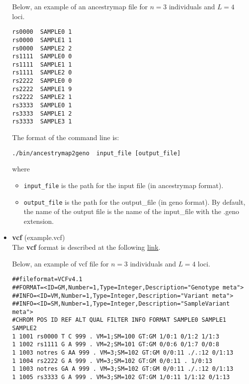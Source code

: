 \documentclass[10pt,a4paper]{article}
\begin{document}
\begin{itemize}
Below, an example of an ancestrymap file for $n=3$ individuals and $L=4$ loci.
\begin{center}
\footnotesize
\begin{Verbatim}[frame=single]
rs0000  SAMPLE0 1
rs0000  SAMPLE1 1
rs0000  SAMPLE2 2
rs1111  SAMPLE0 0
rs1111  SAMPLE1 1
rs1111  SAMPLE2 0
rs2222  SAMPLE0 0
rs2222  SAMPLE1 9
rs2222  SAMPLE2 1
rs3333  SAMPLE0 1
rs3333  SAMPLE1 2
rs3333  SAMPLE3 1
\end{Verbatim}
\end{center}

The format of the command line is:
\begin{Verbatim}[frame=single]
./bin/ancestrymap2geno  input_file [output_file]
\end{Verbatim}
where 
\begin{itemize}
\item \verb|input_file| is the path for the input file (in ancestrymap format).
\item \verb|output_file| is the path for the output\_file (in geno format). 
By default, the name of the output file is the name of the input\_file with the .geno extension.
\end{itemize}

\item {\bf vcf} (example.vcf)\\
The {\bf vcf} format is described at the following \href{http://www.1000genomes.org/wiki/Analysis/Variant\%20Call\%20Format/vcf-variant-call-format-version-41}{link}.

Below, an example of vcf file for $n=3$ individuals and $L=4$ loci.
\begin{center}
\footnotesize
\begin{Verbatim}[frame=single]
##fileformat=VCFv4.1 
##FORMAT=<ID=GM,Number=1,Type=Integer,Description="Genotype meta"> 
##INFO=<ID=VM,Number=1,Type=Integer,Description="Variant meta"> 
##INFO=<ID=SM,Number=1,Type=Integer,Description="SampleVariant meta"> 
#CHROM POS ID REF ALT QUAL FILTER INFO FORMAT SAMPLE0 SAMPLE1 SAMPLE2 
1 1001 rs0000 T C 999 . VM=1;SM=100 GT:GM 1/0:1 0/1:2 1/1:3 
1 1002 rs1111 G A 999 . VM=2;SM=101 GT:GM 0/0:6 0/1:7 0/0:8 
1 1003 notres G AA 999 . VM=3;SM=102 GT:GM 0/0:11 ./.:12 0/1:13 
1 1004 rs2222 G A 999 . VM=3;SM=102 GT:GM 0/0:11 . 1/0:13
1 1003 notres GA A 999 . VM=3;SM=102 GT:GM 0/0:11 ./.:12 0/1:13 
1 1005 rs3333 G A 999 . VM=3;SM=102 GT:GM 1/0:11 1/1:12 0/1:13 
\end{Verbatim}
\end{center}


\end{itemize}
\end{document}
